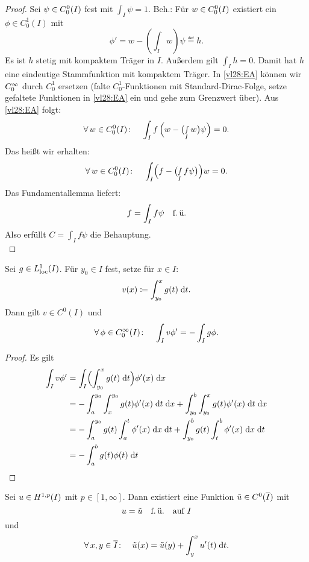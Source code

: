 \begin{proof}
    Sei $\psi\in\Coo(I)$ fest mit $\int_I \psi = 1$. Beh.: Für $w\in\Coo(I)$
    existiert ein $\phi\in C_0^1(I)$ mit
    \[ \phi' = w - \left( \int_I w \right) \psi \eqdef h . \]
    Es ist $h$ stetig mit kompaktem Träger in $I$. Außerdem gilt $\int_I h = 0$.
    Damit hat $h$ eine eindeutige Stammfunktion mit kompaktem Träger. In
    \eqref{vl28:EA} können wir $\Cinfo$ durch $C_0^1$ ersetzen (falte
    $C_0^1$-Funktionen mit Standard-Dirac-Folge, setze gefaltete Funktionen
    in \eqref{vl28:EA} ein und gehe zum Grenzwert über). Aus \eqref{vl28:EA}
    folgt:
    \[ \forall\,w\in\Coo(I)\colon\quad
        \int_I f \, \Bigl( w - \bigl( \smallint_I w \bigr) \psi \Bigr) = 0
    . \]
    Das heißt wir erhalten:
    \[ \forall\,w\in\Coo(I)\colon\quad
        \int_I \Bigl( f - \bigl( \smallint_I f \psi \bigr) \Bigr) w = 0
    . \]
    Das Fundamentallemma liefert:
    \[ f = \int_I f \psi \mfu  \]
    Also erfüllt $C = \int_I f \psi$ die Behauptung.
    \\
\end{proof}

\begin{thLemma} \label{vl28:lemma11.6}
    Sei $g\in\Lploc1(I)$. Für $y_0\in I$ fest, setze für $x\in I$:
    \[ v(x) \defeq \int_{y_0}^x g(t) \dif{t}  . \]
    Dann gilt $v\in C^0(I)$ und
    \[ \forall\,\phi\in\Cinfo(I)\colon\quad
        \int_I v\phi' = -\int_I g\phi
    . \]
\end{thLemma}

\begin{proof}
    Es gilt
    \begin{align*}
        \int_I v\phi'
        &= \int_I \Bigl( \int_{y_0}^x g(t) \dif{t} \Bigr) \phi'(x) \dif{x}
        \\
        &= -\int_a^{y_0} \int_x^{y_0} g(t) \phi'(x) \dif{t} \dif{x}
         + \int_{y_0}^b \int_{y_0}^x g(t) \phi'(x) \dif{t} \dif{x}
        \\
        &= %
        -\int_a^{y_0} g(t) \int_a^t \phi'(x) \dif{x} \dif{t}
        + \int_{y_0}^b g(t) \int_t^b \phi'(x) \dif{x} \dif{t}
        \\
        &= %
        - \int_a^b g(t) \phi(t) \dif{t}
    \end{align*}
\end{proof}

\begin{thTheorem}
    Sei $u\in\SobHI$ mit $p\in[1,\infty]$. Dann existiert eine Funktion
    $\tilde u\in C^0(\setclosure{I})$ mit
    \[ u = \tilde u \mfu \text{\quad auf $I$} \]
    und
    \[ \forall\,x,y\in\setclosure{I}\colon\quad
        \tilde u(x) = \tilde u(y) + \int_y^x u'(t) \dif{t}
    . \]
\end{thTheorem}

